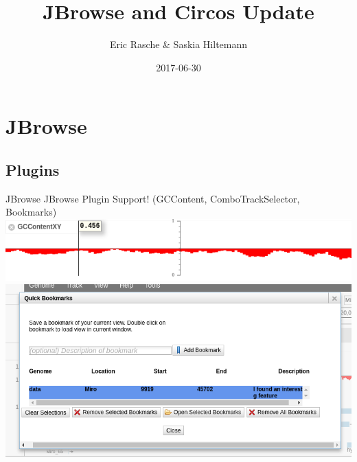 \documentclass[12pt]{phage3slides} %
\title[JBrowse and Circos Update]{JBrowse and Circos Update}
\author[ER/SH]{Eric Rasche \& Saskia Hiltemann}
\date{2017-06-30}
\begin{document}
\frame{\titlepage}


\section{JBrowse}
{
  \begin{frame}[plain]
  \end{frame}
}

\subsection{Plugins}
{
\begin{frame}{JBrowse}
	JBrowse Plugin Support! ({\color{gray}GCContent, ComboTrackSelector, Bookmarks})
	\includegraphics[width=\textwidth]{plugin-gc.png} \\
	\includegraphics[width=\textwidth]{plugin-book.png}
\end{frame}
}
\end{document}
